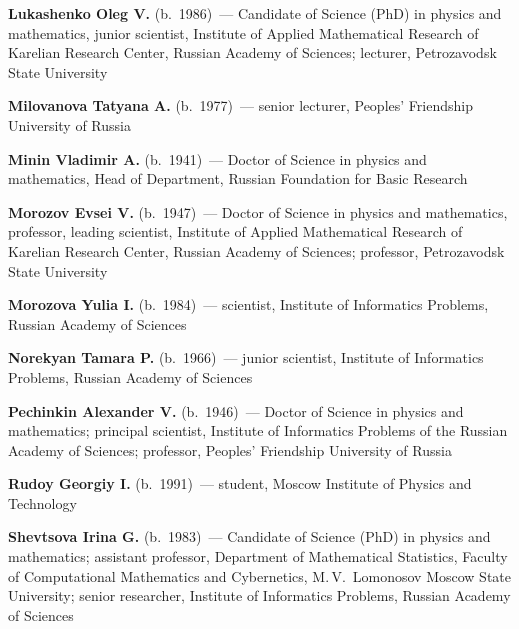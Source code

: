 \begin{multicols}{2}
\noindent
\textbf{Lukashenko Oleg V.} (b.\ 1986)~--- Candidate of Science (PhD) in physics 
and mathematics, junior scientist, Institute of Applied Mathematical Research of 
Karelian Research Center, 
Russian Academy of Sciences; lecturer, Petrozavodsk State University

\vspace*{4pt}

\noindent
\textbf{Milovanova Tatyana A.} (b.\ 1977)~--- senior lecturer, Peoples' 
Friendship University of Russia

\vspace*{4pt}

\noindent
\textbf{Minin Vladimir A.} (b.\ 1941)~--- Doctor of Science in physics and mathematics, 
Head of Department, Russian Foundation for Basic Research

\vspace*{4pt}

\noindent
\textbf{Morozov Evsei V.} (b.\ 1947)~--- Doctor of Science in physics and 
mathematics, professor, leading scientist, 
 Institute of Applied Mathematical Research of Karelian
Research Center, Russian Academy of Sciences; professor,  Petrozavodsk State University

\vspace*{4pt}

\noindent
\textbf{Morozova Yulia I.} (b.\ 1984)~--- scientist, Institute of Informatics Problems, 
Russian Academy of Sciences

\vspace*{4pt}

\noindent
\textbf{Norekyan Tamara P.} (b.\ 1966)~--- junior scientist, Institute of Informatics 
Problems, Russian Academy of Sciences

\vspace*{4pt}

\noindent
\textbf{Pechinkin Alexander V.} (b.\ 1946)~--- Doctor of Science in physics and
mathematics; principal scientist, Institute of Informatics Problems
of the Russian Academy of Sciences; professor, Peoples' Friendship
University of Russia

\vspace*{4pt}

\noindent
\textbf{Rudoy Georgiy I.} (b.\ 1991)~--- student, Moscow Institute of Physics and Technology

\vspace*{4pt}


\noindent
\textbf{Shevtsova Irina G.} (b.\ 1983)~--- Candidate of Science (PhD) 
in physics and mathematics; assistant professor, Department of Mathematical 
Statistics, Faculty of Computational Mathematics and Cybernetics, M.\,V.~Lomonosov 
Moscow State University; senior researcher, Institute of Informatics Problems, 
Russian Academy of Sciences


\end{multicols}
